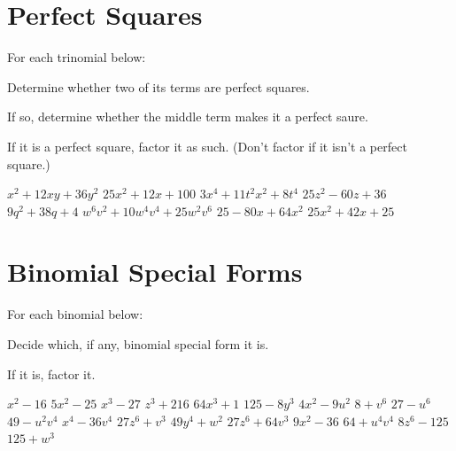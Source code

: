 \section*{Perfect Squares}
For each trinomial below:
\begin{clist}
\item Determine whether two of its terms are perfect squares.
\item If so, determine whether the middle term makes it a perfect saure.
\item If it is a perfect square, factor it as such. (Don't factor if it isn't a perfect square.)
\end{clist}
\begin{smenum}
\mitemxxx
{$x^2+12xy+36y^2$}
{$25x^2+12x+100$}
{$3x^4+11t^2x^2+8t^4$}
\mitemxxx
{$25z^2-60z+36$}
{$9q^2+38q+4$}
{$w^6v^2+10w^4v^4+25w^2v^6$}
\mitemxxo
{$25-80x+64x^2$}
{$25x^2+42x+25$}
\end{smenum}

\section*{Binomial Special Forms}
For each binomial below:
\begin{clist}
\item Decide which, if any, binomial special form it is.
\item If it is, factor it.
\end{clist}
\begin{smenum}
\mitemxxx
{$x^2-16$}
{$5x^2-25$}
{$x^3-27$}
\mitemxxx
{$z^3+216$}
{$64x^3+1$}
{$125-8y^3$}
\mitemxxx
{$4x^2-9u^2$}
{$8+v^6$}
{$27-u^6$}
\mitemxxx
{$49-u^2v^4$}
{$x^4-36v^4$}
{$27z^6+v^3$}
\mitemxxx
{$49y^4+w^2$}
{$27z^6+64v^3$}
{$9x^2-36$}
\mitemxxx
{$64+u^4v^4$}
{$8z^6-125$}
{$125+w^3$}
\end{smenum}

